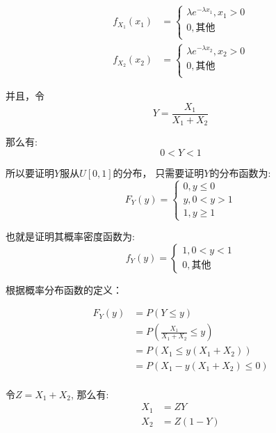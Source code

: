 \documentclass[a4,10pt]{ctexart}
\begin{document}
    \begin{align}
        f_{X_1}(x_1) &=   \begin{cases}
            \lambda e^{-\lambda x_1}, x_1>0 \\
            0, \mbox{其他}\\
        \end{cases} \\
        f_{X_2}(x_2) &=  \begin{cases}
            \lambda e^{-\lambda x_2}, x_2>0 \\
            0, \mbox{其他}\\
        \end{cases}
    \end{align}
    
    
并且，令
\begin{equation}
    Y = \frac{X_1}{X_1+X_2}
\end{equation}

那么有: 
\begin{equation}
    0 < Y < 1
\end{equation}


所以要证明$Y$服从$U[0,1]$的分布，
只需要证明$Y$的分布函数为:
\begin{equation}
    F_Y(y) = \begin{cases}
        0, y\leq 0 \\
        y, 0 < y > 1 \\
        1, y\geq 1
    \end{cases}
\end{equation}

也就是证明其概率密度函数为:
\begin{equation}
    f_Y(y) = \begin{cases}
        1, 0 < y < 1 \\
        0, \mbox{其他}
    \end{cases}
\end{equation}


根据概率分布函数的定义：

\begin{align}
    F_Y(y) &= P(Y \leq y) \\
    &= P(\frac{X_1}{X_1+X_2} \leq y) \\
    &= P(X_1 \leq y(X_1+X_2)) \\
    &= P(X_1 - y(X_1+X_2) \leq 0) \\
\end{align}


令$Z=X_1+X_2$, 那么有:
\begin{align}
    X_1 &= ZY \\
    X_2 &= Z(1-Y)
\end{align}
\end{document}
